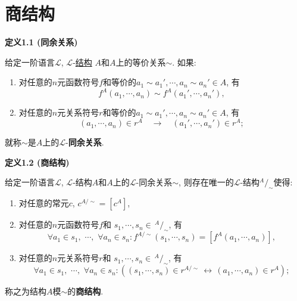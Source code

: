 


\setlength{\abovedisplayskip}{1pt}
\setlength{\belowdisplayskip}{1pt}

\section{商结构}

\hypertarget{sec:定义1.1}{}
\noindent\textbf{定义1.1 (同余关系)}

给定一阶语言$\mathcal{L}$,
$\mathcal{L}$-\href{01 一阶语言的结构#nameddest=sec:定义1.1}{结构}
$A$和$A$上的等价关系$\sim$. 如果:
\begin{enumerate}
    \item 对任意的$n$元函数符号$f$和等价的$a_1\sim a_1',\cdots,a_n\sim a_n'\in A$, 有
    \[
        f^A(a_1,\cdots,a_n)\sim f^A(a_1',\cdots,a_n'),
    \]
    \item 对任意的$n$元关系符号$r$和等价的$a_1\sim a_1',\cdots,a_n\sim a_n'\in A$, 有
    \[
        (a_1,\cdots,a_n)\in r^A\quad\to\quad(a_1',\cdots,a_n')\in r^A;
    \]
\end{enumerate}
就称$\sim$是$A$上的$\mathcal{L}$-\textbf{同余关系}.

\vspace{10pt}

\hypertarget{sec:定义1.2}{}
\noindent\textbf{定义1.2 (商结构)}

给定一阶语言$\mathcal{L}$, $\mathcal{L}$-结构$A$和$A$上的$\mathcal{L}$-同余关系$\sim$,
则存在唯一的$\mathcal{L}$-结构$^{\displaystyle A}\!/_{\displaystyle\sim}$使得:
\begin{enumerate}
    \item 对任意的常元$c$, $c^{A/\sim}=[c^A]$,
    \item 对任意的$n$元函数符号$f$和
    $s_1,\cdots,s_n\in\,\!^{\displaystyle A}\!/_{\displaystyle\sim}$, 有
    \[
        \forall a_1\in s_1,\,\,\cdots,\,\,\forall a_n\in s_n:
        f^{A/\sim}(s_1,\cdots,s_n)=[f^A(a_1,\cdots,a_n)],
    \]
    \vspace{-13pt}
    \item 对任意的$n$元关系符号$r$和
    $s_1,\cdots,s_n\in\,\!^{\displaystyle A}\!/_{\displaystyle\sim}$, 有
    \[
        \forall a_1\in s_1,\,\,\cdots,\,\,\forall a_n\in s_n:
        ((s_1,\cdots,s_n)\in r^{A/\sim}\,\leftrightarrow\,(a_1,\cdots,a_n)\in r^A);
    \]
\end{enumerate}
称之为结构$A$模$\sim$的\textbf{商结构}.


